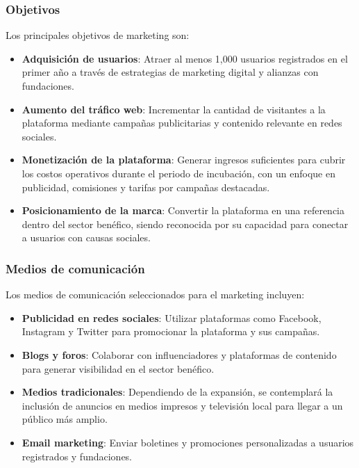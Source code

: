 \documentclass[a4paper,12pt]{article}
\begin{document}
\subsubsection{Objetivos}
Los principales objetivos de marketing son:
\begin{itemize}
    \item \textbf{Adquisición de usuarios}: Atraer al menos 1,000 usuarios registrados en el primer año a través de estrategias de marketing digital y alianzas con fundaciones.
    \item \textbf{Aumento del tráfico web}: Incrementar la cantidad de visitantes a la plataforma mediante campañas publicitarias y contenido relevante en redes sociales.
    \item \textbf{Monetización de la plataforma}: Generar ingresos suficientes para cubrir los costos operativos durante el periodo de incubación, con un enfoque en publicidad, comisiones y tarifas por campañas destacadas.
    \item \textbf{Posicionamiento de la marca}: Convertir la plataforma en una referencia dentro del sector benéfico, siendo reconocida por su capacidad para conectar a usuarios con causas sociales.
\end{itemize}

\subsubsection{Medios de comunicación}
Los medios de comunicación seleccionados para el marketing incluyen:
\begin{itemize}
    \item \textbf{Publicidad en redes sociales}: Utilizar plataformas como Facebook, Instagram y Twitter para promocionar la plataforma y sus campañas.
    \item \textbf{Blogs y foros}: Colaborar con influenciadores y plataformas de contenido para generar visibilidad en el sector benéfico.
    \item \textbf{Medios tradicionales}: Dependiendo de la expansión, se contemplará la inclusión de anuncios en medios impresos y televisión local para llegar a un público más amplio.
    \item \textbf{Email marketing}: Enviar boletines y promociones personalizadas a usuarios registrados y fundaciones.
\end{itemize}
\end{document}
